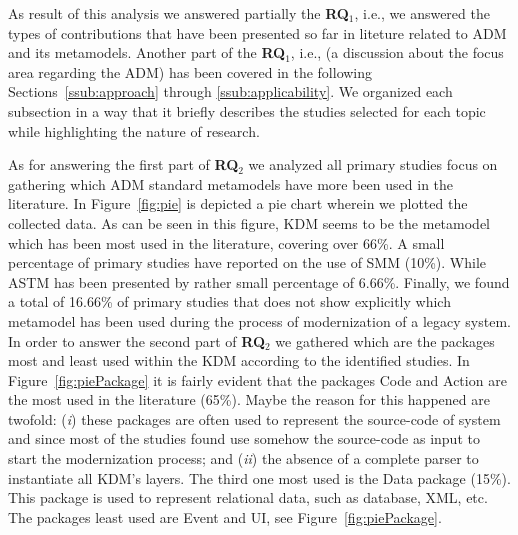 

 As result of this analysis we answered partially the \textbf{RQ$_1$}, i.e., we answered the types of contributions that have been presented so far in liteture related to ADM and its metamodels. Another part of the \textbf{RQ$_1$}, i.e., (a discussion about the focus area regarding the ADM) has been covered in the following Sections~\ref{ssub:approach} through \ref{ssub:applicability}. We organized each subsection in a way that it briefly describes the studies selected for each topic while highlighting the nature of research. %

As for answering the first part of \textbf{RQ$_2$} we analyzed all primary studies focus on gathering which ADM standard metamodels have more been used in the literature. In Figure~\ref{fig:pie} is depicted a pie chart wherein we plotted the collected data. As can be seen in this figure, KDM seems to be the metamodel which has been most used in the literature, covering over 66\%. A small percentage of primary studies have reported on the use of SMM (10\%). While ASTM has been presented by rather small percentage of 6.66\%. Finally, we found a total of 16.66\% of primary studies that does not show explicitly which metamodel has been used during the process of modernization of a legacy system. In order to answer the second part of \textbf{RQ$_2$} we gathered which are the packages most and least used within the KDM according to the identified studies. In Figure~\ref{fig:piePackage} it is fairly evident that the packages Code and Action are the most used in the literature (65\%). Maybe the reason for this happened are twofold: (\textit{i}) these packages are often used to represent the source-code of system and since most of the studies found use somehow the source-code as input to start the modernization process; and (\textit{ii}) the absence of a complete parser to instantiate all KDM's layers. The third one most used is the Data package (15\%). This package is used to represent relational data, such as database, XML, etc. The packages least used are Event and UI, see Figure~\ref{fig:piePackage}. 

